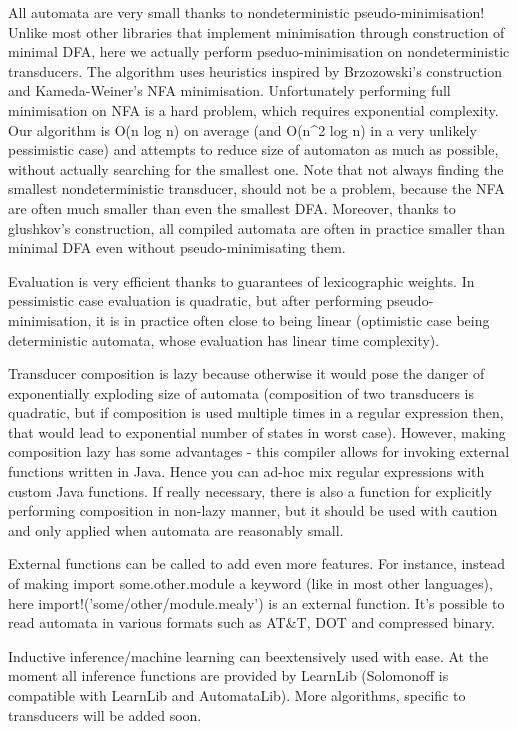 \documentclass[oneside,polski,logo]{amuthesis}
\begin{document}
\begin{streszczenie}
All automata are very small thanks to nondeterministic pseudo-minimisation! Unlike most other libraries that implement minimisation through construction of minimal DFA, here we actually perform pseduo-minimisation on nondeterministic transducers. The algorithm uses heuristics inspired by Brzozowski's construction and Kameda-Weiner's NFA minimisation. Unfortunately performing full minimisation on NFA is a hard problem, which requires exponential complexity. Our algorithm is O(n log n) on average (and O(n^2 log n) in a very unlikely pessimistic case) and attempts to reduce size of automaton as much as possible, without actually searching for the smallest one. Note that not always finding the smallest nondeterministic transducer, should not be a problem, because the NFA are often much smaller than even the smallest DFA. Moreover, thanks to glushkov's construction, all compiled automata are often in practice smaller than minimal DFA even without pseudo-minimisating them.


Evaluation is very efficient thanks to guarantees of lexicographic weights. In pessimistic case evaluation is quadratic, but after performing pseudo-minimisation, it is in practice often close to being linear (optimistic case being deterministic automata, whose evaluation has linear time complexity).


Transducer composition is lazy because otherwise it would pose the danger of exponentially exploding size of automata (composition of two transducers is quadratic, but if composition is used multiple times in a regular expression then, that would lead to exponential number of states in worst case). However, making composition lazy has some advantages - this compiler allows for invoking external functions written in Java. Hence you can ad-hoc mix regular expressions with custom Java functions. If really necessary, there is also a function for explicitly performing composition in non-lazy manner, but it should be used with caution and only applied when automata are reasonably small.


External functions can be called to add even more features. For instance, instead of making import some.other.module a keyword (like in most other languages), here import!('some/other/module.mealy') is an external function. It's possible to read automata in various formats such as AT&T, DOT and compressed binary.


Inductive inference/machine learning can beextensively used with ease. At the moment all inference functions are provided by LearnLib (Solomonoff is compatible with LearnLib and AutomataLib). More algorithms, specific to transducers will be added soon.



\end{streszczenie}
\end{document}
